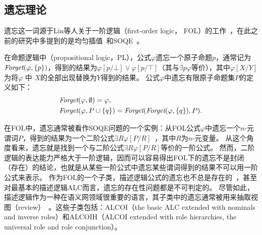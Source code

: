 \subsection{遗忘理论}\label{chapter01:forgetting}
遗忘这一词源于Lin等人关于一阶逻辑（first-order logic， FOL）的工作~\cite{lin1994forget}，在此之前的研究中多提到的是均匀插值~\cite{visser1996uniform,konev2009forgetting}和SOQE~\cite{ackermann1935untersuchungen}。

在命题逻辑中（propositional logic，PL），公式$\varphi$遗忘一个原子命题$p$，通常记为$\textit{Forget}(\varphi,\{p\})$，得到的结果为$\varphi[p/\bot] \vee \varphi[p/\top]$（其与$\exists p\varphi$等价），其中$\varphi[X/Y]$为将$\varphi$ 中 $X$的全部出现替换为$Y$得到的结果。
公式$\varphi$中遗忘有限原子命题集$P$的定义如下：
\begin{alignat*}{2}
	&  \Forget(\varphi, \emptyset) = \varphi, \qquad \\ %
	&  \Forget(\varphi, P \cup \{q\})  = \Forget(\Forget(\varphi, \{q\}), P).
	\nonumber
\end{alignat*}

在FOL中，遗忘通常被看作SOQE问题的一个实例：从FOL公式$\varphi$中遗忘一个$n$-元谓词$P$，得到的结果为一个二阶公式$\exists R \varphi[P/R]$~\cite{lin1994forget}，其中$R$为$n$-元变量。
从这个角度看来，遗忘就是找到一个与二阶公式$\exists R \varphi[P/R]$等价的一阶公式。
然而，二阶逻辑的表达能力严格大于一阶逻辑，因而可以容易得出FOL下的遗忘不是封闭（存在）的结论，也就是从某些一阶公式中遗忘某些谓词得到的结果不可以用一阶公式来表示。
作为FOL的一个子类，描述逻辑公式的遗忘也不总是存在的~\cite{DBLP:journals/ai/KonevL0W13}，甚至对最基本的描述逻辑{\cal ALC}而言，遗忘的存在性问题都是不可判定的。
尽管如此，描述逻辑作为一种在语义网领域很重要的语言，其子类中的遗忘通常被用来抽取视图（review）~\cite{Wang:AMAI:2010,DBLP:conf/ijcai/LutzW11,Konev:JAIR:2012,DBLP:conf/ijcai/ZhaoS17,DBLP:conf/aaai/ZhaoSWZF20}。这些子类包括：ALCOI（the basic ALC extended with nominals and inverse roles）和ALCOIH（ALCOI extended with role hierarchies, the universal role and role conjunction）。%

